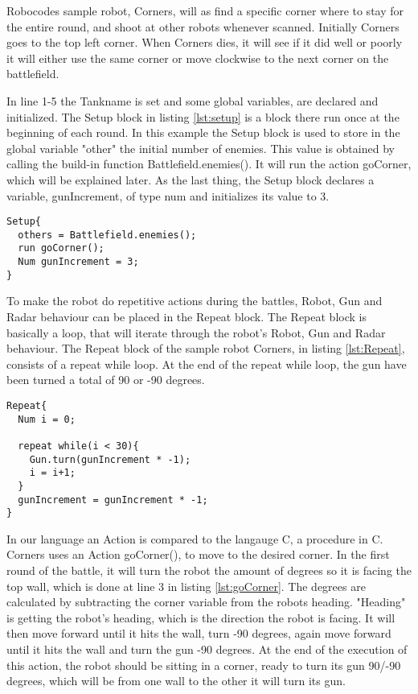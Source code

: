Robocodes sample robot, Corners\cite{Corners}, will as find a specific corner where to stay for the entire round, and shoot at other robots whenever scanned. Initially Corners goes to the top left corner. When Corners dies, it will see if it did well or poorly it will either use the same corner or move clockwise to the next corner on the battlefield.

In line 1-5 the Tankname is set and some global variables, are declared and initialized. The Setup block in listing \ref{lst:setup} is a block there run once at the beginning of each round. In this example the Setup block is used to store in the global variable "other" the initial number of enemies. This value is obtained by calling the build-in function Battlefield.enemies(). It will run the action goCorner, which will be explained later. As the last thing, the Setup block declares a variable, gunIncrement, of type num and initializes its value to 3.

\begin{lstlisting}[caption={Code listing of the Setup block},  xleftmargin=.2\textwidth, label={lst:setup}]
Setup{
  others = Battlefield.enemies();  
  run goCorner();	 
  Num gunIncrement = 3;
}
\end{lstlisting}

To make the robot do repetitive actions during the battles, Robot, Gun and Radar behaviour can be placed in the Repeat block. The Repeat block is basically a loop, that will iterate through the robot's Robot, Gun and Radar behaviour. The Repeat block of the sample robot Corners, in listing \ref{lst:Repeat}, consists of a repeat while loop. At the end of the repeat while loop, the gun have been turned a total of 90 or -90 degrees. 

\begin{lstlisting}[caption={Code listing of the Repeat block}, xleftmargin=.2\textwidth, label={lst:Repeat}]
Repeat{  
  Num i = 0;
  
  repeat while(i < 30){
    Gun.turn(gunIncrement * -1);
    i = i+1;
  }  
  gunIncrement = gunIncrement * -1;
}
\end{lstlisting}

In our language an Action is compared to the langauge C, a procedure in C. Corners uses an Action goCorner(), to move to the desired corner. In the first round of the battle, it will turn the robot the amount of degrees so it is facing the top wall, which is done at line 3 in listing \ref{lst:goCorner}. The degrees are calculated by subtracting the corner variable from the robots heading. "Heading" is getting the robot's heading, which is the direction the robot is facing. It will then move forward until it hits the wall, turn -90 degrees, again  move forward until it hits the wall and turn the gun -90 degrees. At the end of the execution of this action, the robot should be sitting in a corner, ready to turn its gun 90/-90 degrees, which will be from one wall to the other it will turn its gun.


